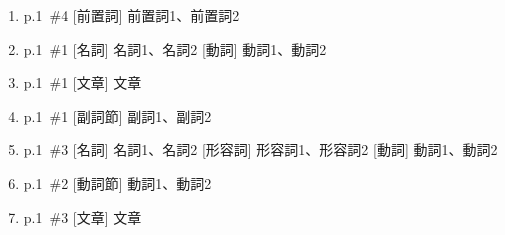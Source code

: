 \documentclass[a4paper,11pt]{jsarticle}
\begin{document}
\begin{enumerate}
  \setlength{\itemsep}{2truecm}
  \item
    p.1~\#4  [前置詞] 前置詞1、前置詞2
  \item
    p.1~\#1  [名詞] 名詞1、名詞2  [動詞] 動詞1、動詞2
  \item
    p.1~\#1 [文章] 文章
  \item
    p.1~\#1  [副詞節] 副詞1、副詞2
  \item
    p.1~\#3  [名詞] 名詞1、名詞2  [形容詞] 形容詞1、形容詞2  [動詞] 動詞1、動詞2
  \item
    p.1~\#2  [動詞節] 動詞1、動詞2
  \item
    p.1~\#3 [文章] 文章
\end{enumerate}
\end{document}
